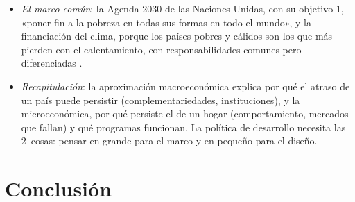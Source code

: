 \documentclass[11pt]{article}
\begin{document}
\begin{itemize}
\item \emph{El marco común}: la Agenda 2030 de las Naciones Unidas, con su objetivo 1, «poner fin a la pobreza en todas sus formas en todo el mundo»\nocite{ONU2015Agenda}, y la financiación del clima, porque los países pobres y cálidos son los que más pierden con el calentamiento, con responsabilidades comunes pero diferenciadas .
\item \emph{Recapitulación}: la aproximación macroeconómica explica por qué el atraso de un país puede persistir (complementariedades, instituciones), y la microeconómica, por qué persiste el de un hogar (comportamiento, mercados que fallan) y qué programas funcionan. La política de desarrollo necesita las 2~cosas: pensar en grande para el marco y en pequeño para el diseño.
\end{itemize}


\section*{Conclusión}
\end{document}

